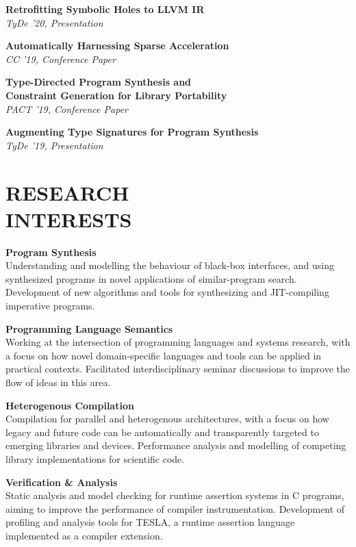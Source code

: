 \documentclass[margin]{res}
\begin{document}
\begin{resume}
\par
\textbf{Retrofitting Symbolic Holes to LLVM IR}\\
\emph{TyDe '20, Presentation}

\par
\textbf{Automatically Harnessing Sparse Acceleration}\\
\emph{CC '19, Conference Paper}

\par
\textbf{Type-Directed Program Synthesis and\\Constraint Generation for Library Portability}\\
\emph{PACT '19, Conference Paper}

\par
\textbf{Augmenting Type Signatures for Program Synthesis}\\
\emph{TyDe '19, Presentation}

\section{RESEARCH\\INTERESTS}

\par
\textbf{Program Synthesis}\\
Understanding and modelling the behaviour of black-box interfaces, and using
synthesized programs in novel applications of similar-program search.
Development of new algorithms and tools for synthesizing and JIT-compiling
imperative programs.

\par
\textbf{Programming Language Semantics}\\
Working at the intersection of programming languages and systems research, with
a focus on how novel domain-specific languages and tools can be applied in
practical contexts. Facilitated interdisciplinary seminar discussions to improve
the flow of ideas in this area.

\par
\textbf{Heterogenous Compilation}\\
Compilation for parallel and heterogenous architectures, with a focus on how
legacy and future code can be automatically and transparently targeted to
emerging libraries and devices. Performance analysis and modelling of
competing library implementations for scientific code.

\par
\textbf{Verification \& Analysis}\\
Static analysis and model checking for runtime assertion systems in C programs,
aiming to improve the performance of compiler instrumentation. Development of
profiling and analysis tools for TESLA, a runtime assertion language implemented
as a compiler extension.


\end{resume}
\end{document}
